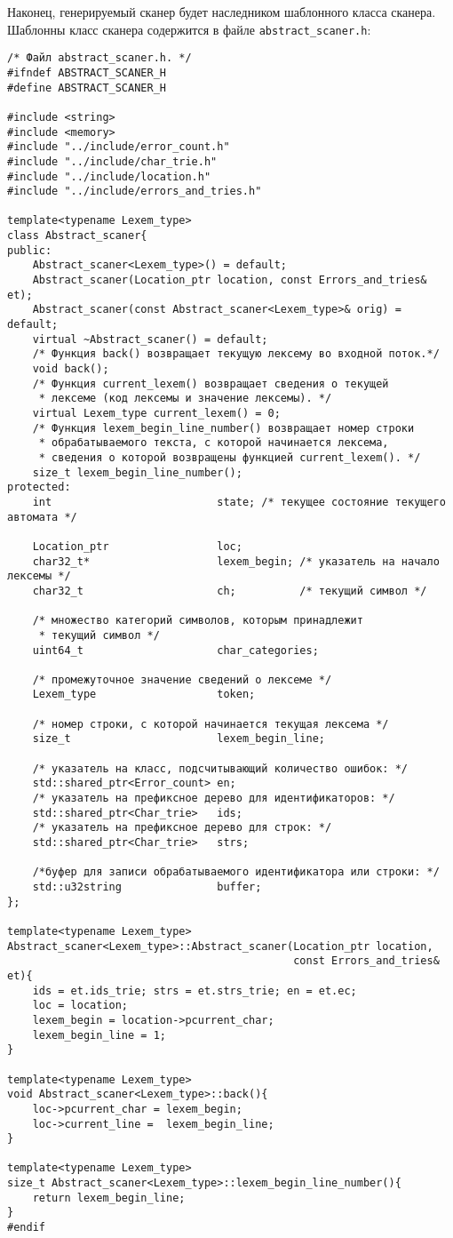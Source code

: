 \documentclass[10pt]{report}
\newcounter{defin}[section]
\begin{document}
Наконец, генерируемый сканер будет наследником шаблонного класса сканера. Шаблонны класс сканера содержится в файле \texttt{abstract_scaner.h}:
\begin{verbatim}
/* Файл abstract_scaner.h. */
#ifndef ABSTRACT_SCANER_H
#define ABSTRACT_SCANER_H

#include <string>
#include <memory>
#include "../include/error_count.h"
#include "../include/char_trie.h"
#include "../include/location.h"
#include "../include/errors_and_tries.h"

template<typename Lexem_type>
class Abstract_scaner{
public:
    Abstract_scaner<Lexem_type>() = default;
    Abstract_scaner(Location_ptr location, const Errors_and_tries& et);
    Abstract_scaner(const Abstract_scaner<Lexem_type>& orig) = default;
    virtual ~Abstract_scaner() = default;
    /* Функция back() возвращает текущую лексему во входной поток.*/
    void back();
    /* Функция current_lexem() возвращает сведения о текущей
     * лексеме (код лексемы и значение лексемы). */
    virtual Lexem_type current_lexem() = 0;
    /* Функция lexem_begin_line_number() возвращает номер строки
     * обрабатываемого текста, с которой начинается лексема,
     * сведения о которой возвращены функцией current_lexem(). */
    size_t lexem_begin_line_number();
protected:
    int                          state; /* текущее состояние текущего автомата */

    Location_ptr                 loc;
    char32_t*                    lexem_begin; /* указатель на начало лексемы */
    char32_t                     ch;          /* текущий символ */

    /* множество категорий символов, которым принадлежит
     * текущий символ */
    uint64_t                     char_categories;

    /* промежуточное значение сведений о лексеме */
    Lexem_type                   token;

    /* номер строки, с которой начинается текущая лексема */
    size_t                       lexem_begin_line;

    /* указатель на класс, подсчитывающий количество ошибок: */
    std::shared_ptr<Error_count> en;
    /* указатель на префиксное дерево для идентификаторов: */
    std::shared_ptr<Char_trie>   ids;
    /* указатель на префиксное дерево для строк: */
    std::shared_ptr<Char_trie>   strs;

    /*буфер для записи обрабатываемого идентификатора или строки: */
    std::u32string               buffer;
};

template<typename Lexem_type>
Abstract_scaner<Lexem_type>::Abstract_scaner(Location_ptr location,
                                             const Errors_and_tries& et){
    ids = et.ids_trie; strs = et.strs_trie; en = et.ec;
    loc = location;
    lexem_begin = location->pcurrent_char;
    lexem_begin_line = 1;
}

template<typename Lexem_type>
void Abstract_scaner<Lexem_type>::back(){
    loc->pcurrent_char = lexem_begin;
    loc->current_line =  lexem_begin_line;
}

template<typename Lexem_type>
size_t Abstract_scaner<Lexem_type>::lexem_begin_line_number(){
    return lexem_begin_line;
}
#endif
\end{verbatim}
\end{document}
